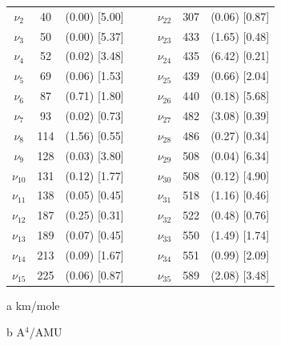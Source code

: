 \begin{table}[H]
\begin{center}
\begin{threeparttable}
\begin{tabular}{c c c c c c c c}
		$\nu_{2}$&  40 & (0.00)  [5.00] &  &    & $\nu_{22}$ & 307 & (0.06)  [0.87] \\ 
		$\nu_{3}$&  50 & (0.00)  [5.37] &  &    & $\nu_{23}$ & 433 & (1.65)  [0.48] \\ 
		$\nu_{4}$&  52 & (0.02)  [3.48] &  &    & $\nu_{24}$ & 435 & (6.42)  [0.21] \\ 
		$\nu_{5}$&  69 & (0.06)  [1.53] &  &    & $\nu_{25}$ & 439 & (0.66) [2.04] \\ 
		$\nu_{6}$&  87 & (0.71)  [1.80] &  &    & $\nu_{26}$ & 440 & (0.18)  [5.68] \\ 
		$\nu_{7}$&  93 & (0.02)  [0.73] &  &    & $\nu_{27}$ & 482 & (3.08)  [0.39] \\ 
		$\nu_{8}$&  114 & (1.56)  [0.55] &  &    & $\nu_{28}$&  486 & (0.27)  [0.34] \\ 
		$\nu_{9}$&  128 & (0.03)  [3.80] &  &    & $\nu_{29}$ & 508 & (0.04)  [6.34] \\ 
		$\nu_{10}$& 131 & (0.12)  [1.77] &  &    & $\nu_{30}$ & 508 & (0.12)  [4.90] \\ 
		$\nu_{11}$&  138 & (0.05)  [0.45] &  &    & $\nu_{31}$ & 518 & (1.16)  [0.46] \\ 
		$\nu_{12}$&  187 & (0.25)  [0.31] &  &    & $\nu_{32}$ & 522 & (0.48)  [0.76] \\ 
		$\nu_{13}$&  189 & (0.07)  [0.45] &  &    & $\nu_{33}$ & 550 & (1.49)  [1.74] \\ 
		$\nu_{14}$&  213 & (0.09)  [1.67] &  &    & $\nu_{34}$ & 551 & (0.99)  [2.09] \\ 
		$\nu_{15}$&  225 & (0.06)  [0.87] &  &    & $\nu_{35}$ & 589 & (2.08)  [3.48] \\ 
			\bottomrule
			\end{tabular}
			
			\begin{tablenotes}
				\item[a] km/mole
				\item[b] A$^{4}$/AMU
			\end{tablenotes}
		\end{threeparttable}
	\end{center}
	\label{lowfreq-18-dimethylflDi}
\end{table}			
		
		
		
		
		
		
	
	
